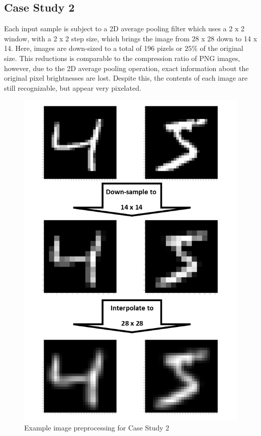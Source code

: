 \documentclass{IEEEtran}
\begin{document}
\subsection{Case Study 2}
 Each input sample is subject to a 2D average pooling filter which uses a 2 x 2 window, with a 2 x 2 step size, which brings the image from 28 x 28 down to 14 x 14. Here, images are down-sized to a total of 196 pizels or $25\%$ of the original size. This reductions is comparable to the compression ratio of PNG images, however, due to the 2D average pooling operation, exact information about the original pixel brightnesses are lost. Despite this, the contents of each image are still recognizable, but appear very pixelated.
 \begin{figure}[!h]
    \centering
    \includegraphics[scale=0.5]{fig/caseStudy2.png}
    \caption{Example image preprocessing for Case Study 2}
    \label{fig:caseStudy2}
\end{figure}
\end{document}
